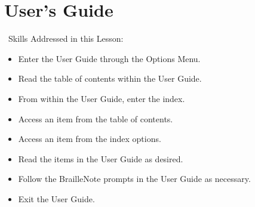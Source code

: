 \documentclass[10pt,letterpaper,twoside]{report}
\begin{document}
{{{%
\clearpage
\section{ User's Guide}
\
Skills Addressed in this Lesson:
\begin{itemize}
	\item Enter the User Guide through the Options Menu.
	\item Read the table of contents within the User Guide.
	\item From within the User Guide, enter the index.
	\item Access an item from the table of contents.
	\item Access an item from the index options.
	\item Read the items in the User Guide as desired.
	\item Follow the BrailleNote prompts in the User Guide as necessary.
	\item Exit the User Guide.
\end{itemize}
}}}
\end{document}
